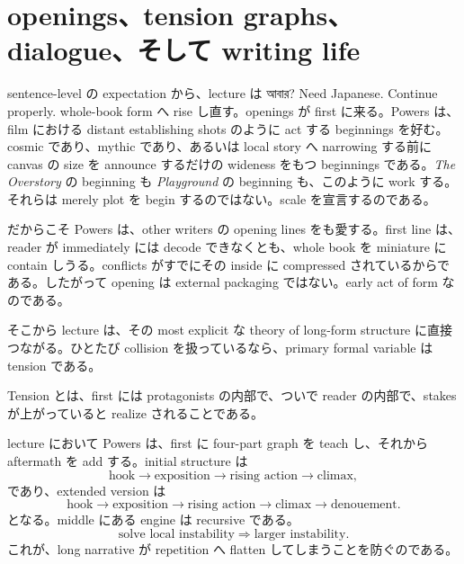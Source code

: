 \section{openings、tension graphs、dialogue、そして writing life}

sentence-level の expectation から、lecture は আবার? Need Japanese. Continue properly. whole-book form へ rise し直す。openings が first に来る。Powers は、film における distant establishing shots のように act する beginnings を好む。cosmic であり、mythic であり、あるいは local story へ narrowing する前に canvas の size を announce するだけの wideness をもつ beginnings である。\emph{The Overstory} の beginning も \emph{Playground} の beginning も、このように work する。それらは merely plot を begin するのではない。scale を宣言するのである。

だからこそ Powers は、other writers の opening lines をも愛する。first line は、reader が immediately には decode できなくとも、whole book を miniature に contain しうる。conflicts がすでにその inside に compressed されているからである。したがって opening は external packaging ではない。early act of form なのである。

そこから lecture は、その most explicit な theory of long-form structure に直接つながる。ひとたび collision を扱っているなら、primary formal variable は tension である。

\begin{definition}
Tension とは、first には protagonists の内部で、ついで reader の内部で、stakes が上がっていると realize されることである。
\end{definition}

lecture において Powers は、first に four-part graph を teach し、それから aftermath を add する。initial structure は
\begin{equation}
\text{hook} \to \text{exposition} \to \text{rising action} \to \text{climax},
\end{equation}
であり、extended version は
\begin{equation}
\text{hook} \to \text{exposition} \to \text{rising action} \to \text{climax} \to \text{denouement}.
\end{equation}
となる。middle にある engine は recursive である。
\begin{equation}
\text{solve local instability} \Rightarrow \text{larger instability}.
\end{equation}
これが、long narrative が repetition へ flatten してしまうことを防ぐのである。

